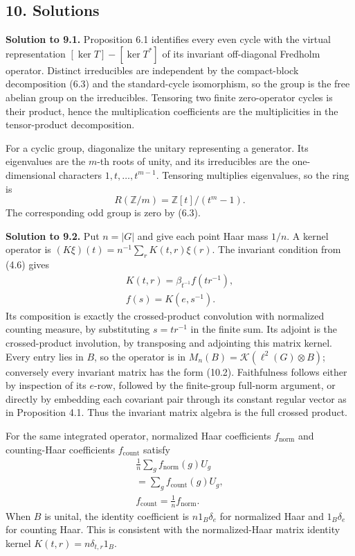 \documentclass[
  11pt,
]{article}
\begin{document}
\subsection{10. Solutions}\label{solutions}

\textbf{Solution to 9.1.} Proposition 6.1 identifies every even cycle
with the virtual representation \([\ker T]-[\ker T^*]\) of its invariant
off-diagonal Fredholm operator. Distinct irreducibles are independent by
the compact-block decomposition (6.3) and the standard-cycle
isomorphism, so the group is the free abelian group on the irreducibles.
Tensoring two finite zero-operator cycles is their product, hence the
multiplication coefficients are the multiplicities in the tensor-product
decomposition.

For a cyclic group, diagonalize the unitary representing a generator.
Its eigenvalues are the \(m\)-th roots of unity, and its irreducibles
are the one-dimensional characters \(1,t,\ldots,t^{m-1}\). Tensoring
multiplies eigenvalues, so the ring is \[
R(\mathbb Z/m)=\mathbb Z[t]/(t^m-1).
\tag{10.1}
\] The corresponding odd group is zero by (6.3).

\textbf{Solution to 9.2.} Put \(n=|G|\) and give each point Haar mass
\(1/n\). A kernel operator is \((K\xi)(t)=n^{-1}\sum_r K(t,r)\xi(r)\).
The invariant condition from (4.6) gives \[
\begin{gathered}
K(t,r)=\beta_{t^{-1}}f(tr^{-1}),\\
f(s)=K(e,s^{-1}).
\end{gathered}
\tag{10.2}
\] Its composition is exactly the crossed-product convolution with
normalized counting measure, by substituting \(s=tr^{-1}\) in the finite
sum. Its adjoint is the crossed-product involution, by transposing and
adjointing this matrix kernel. Every entry lies in \(B\), so the
operator is in \(M_n(B)=\mathcal K(\ell^2(G)\otimes B)\); conversely
every invariant matrix has the form (10.2). Faithfulness follows either
by inspection of its \(e\)-row, followed by the finite-group full-norm
argument, or directly by embedding each covariant pair through its
constant regular vector as in Proposition 4.1. Thus the invariant matrix
algebra is the full crossed product.

For the same integrated operator, normalized Haar coefficients
\(f_{\mathrm{norm}}\) and counting-Haar coefficients
\(f_{\mathrm{count}}\) satisfy \[
\begin{gathered}
\frac1n\sum_g f_{\mathrm{norm}}(g)U_g
\\ =\sum_g f_{\mathrm{count}}(g)U_g,\\
f_{\mathrm{count}}=\frac1n f_{\mathrm{norm}}.
\end{gathered}
\tag{10.2a}
\] When \(B\) is unital, the identity coefficient is \(n1_B\delta_e\)
for normalized Haar and \(1_B\delta_e\) for counting Haar. This is
consistent with the normalized-Haar matrix identity kernel
\(K(t,r)=n\delta_{t,r}1_B\).
\end{document}
